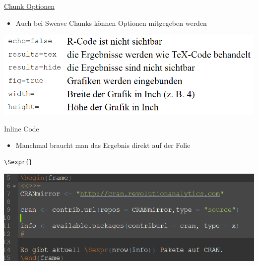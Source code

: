 \documentclass[ignorenonframetext,]{beamer}
\providecommand{\tightlist}{%
\setlength{\itemsep}{0pt}\setlength{\parskip}{0pt}}
\begin{document}
\begin{frame}{\href{http://k-baeumchen.fuhlbrueck.net/R-und-LaTeX.html}{Chunk
Optionen}}

\begin{itemize}
\tightlist
\item
  Auch bei Sweave Chunks können Optionen mitgegeben werden
\end{itemize}

\includegraphics{./tex2pdf.956/02f24b7a4ad8b23dfc56749a2f2585e9e686e644.png}

\end{frame}

\begin{frame}[fragile]{Inline Code}

\begin{itemize}
\tightlist
\item
  Manchmal braucht man das Ergebnis direkt auf der Folie
\end{itemize}

\begin{verbatim}
\Sexpr{}
\end{verbatim}

\includegraphics{./tex2pdf.956/ed18be517977d19723c5b6fd48c9cac20ae9d298.png}

\end{frame}
\end{document}
